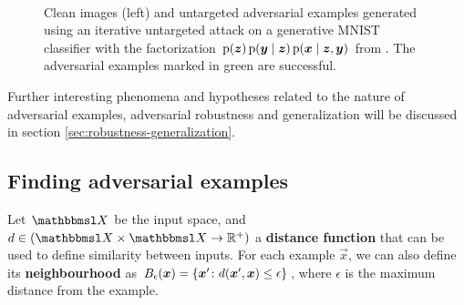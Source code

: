 \documentclass{article}
\begin{document}
\begin{figure}
	\begin{center}
		\
	\end{center}
	\caption{Clean images (left) and untargeted adversarial examples generated using an iterative untargeted attack on a generative MNIST \citep{LeCun:2015:DL} classifier with the factorization $\p(\vec z)\p(\vec y\mid\vec z)\p(\vec x\mid\vec z,\vec y)$ from \citet{Li:2019:AGCMRAA}. The adversarial examples marked in green are successful.}
	\label{fig:li-gfz-adversarial-examples-mnist}
\end{figure}

Further interesting phenomena and hypotheses related to the nature of adversarial examples, adversarial robustness and generalization will be discussed in section \ref{sec:robustness-generalization}.


\subsection{Finding adversarial examples} \label{sec:finding-adversarial-examples}

Let $\set X$ be the input space,
and $d\in(\set X\times\set X\to \R^+)$ a \textbf{distance function} that can be used to define similarity between inputs. 
For each example $\vec x$, 
we can also define its \textbf{neighbourhood} as $B_{\epsilon}(\vec x) = \cbr{\vec x'\colon d(\vec x', \vec x) \leq \epsilon}$,
where $\epsilon$ is the maximum distance from the example.
\end{document}
